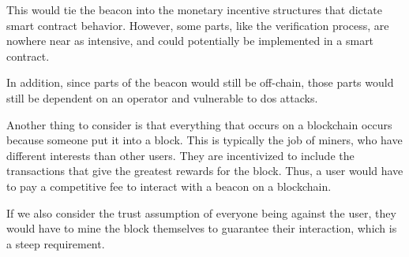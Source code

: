 This would tie the beacon into the monetary incentive structures that dictate smart contract behavior.
However, some parts, like the verification process, are nowhere near as intensive, and could potentially be implemented in a smart contract.

In addition, since parts of the beacon would still be off-chain, those parts would still be dependent on an operator and vulnerable to \acrshort{dos} attacks.

Another thing to consider is that everything that occurs on a blockchain occurs because someone put it into a block.
This is typically the job of miners, who have different interests than other users.
They are incentivized to include the transactions that give the greatest rewards for the block.
Thus, a user would have to pay a competitive fee to interact with a beacon on a blockchain.

If we also consider the trust assumption of everyone being against the user, they would have to mine the block themselves to guarantee their interaction, which is a steep requirement.

